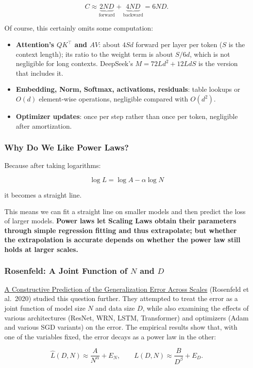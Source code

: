 \documentclass[
  english,
  11pt,
  a4paper,
]{article}
\providecommand{\tightlist}{%
  \setlength{\itemsep}{0pt}\setlength{\parskip}{0pt}}
\newenvironment{NotesFormula}{%
  \par\noindent\begin{minipage}{\linewidth}%
  \setlength{\parindent}{2em}%
  \setlength{\parskip}{0.35em}%
}{\end{minipage}\par}
\begin{document}
\[C\approx\underbrace{2ND}_{\text{forward}}+\underbrace{4ND}_{\text{backward}}=6ND.\]

Of course, this certainly omits some computation:

\begin{itemize}
\tightlist
\item
  \textbf{Attention's \(QK^\top\) and \(AV\)}: about \(4Sd\) forward per
  layer per token (\(S\) is the context length); its ratio to the weight
  term is about \(S/6d\), which is not negligible for long contexts.
  DeepSeek's \(M=72Ld^2+12LdS\) is the version that includes it.
\item
  \textbf{Embedding, Norm, Softmax, activations, residuals}: table
  lookups or \(O(d)\) element-wise operations, negligible compared with
  \(O(d^2)\).
\item
  \textbf{Optimizer updates}: once per step rather than once per token,
  negligible after amortization.
\end{itemize}

\subsubsection{Why Do We Like Power
Laws?}\label{why-do-we-like-power-laws}

\begin{NotesFormula}

Because after taking logarithms:

\[\log L=\log A-\alpha\log N\]

\end{NotesFormula}

it becomes a straight line.

This means we can fit a straight line on smaller models and then predict
the loss of larger models. \textbf{Power laws let Scaling Laws obtain
their parameters through simple regression fitting and thus extrapolate;
but whether the extrapolation is accurate depends on whether the power
law still holds at larger scales.}

\subsubsection{\texorpdfstring{Rosenfeld: A Joint Function of \(N\) and
\(D\)}{Rosenfeld: A Joint Function of N and D}}\label{rosenfeld-a-joint-function-of-n-and-d}

\begin{NotesFormula}

\href{https://arxiv.org/abs/1909.12673}{A Constructive Prediction of the
Generalization Error Across Scales} (Rosenfeld et al.~2020) studied this
question further. They attempted to treat the error as a joint function
of model size \(N\) and data size \(D\), while also examining the
effects of various architectures (ResNet, WRN, LSTM, Transformer) and
optimizers (Adam and various SGD variants) on the error. The empirical
results show that, with one of the variables fixed, the error decays as
a power law in the other:

\[\hat L(D,N)\approx\frac{A}{N^\alpha}+E_N,\qquad
\hat L(D,N)\approx\frac{B}{D^\beta}+E_D.\]

\end{NotesFormula}
\end{document}
